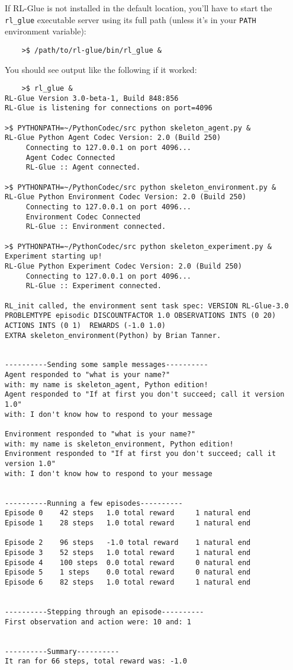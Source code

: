 \documentclass[11pt]{article}
\begin{document}
If RL-Glue is not installed in the default location, you'll have to start the \texttt{rl\_glue} executable server using its full path (unless it's in your \texttt{PATH} environment variable):
\begin{verbatim}
	>$ /path/to/rl-glue/bin/rl_glue &
\end{verbatim}

You should see output like the following if it worked:
\begin{verbatim}
	>$ rl_glue &
RL-Glue Version 3.0-beta-1, Build 848:856
RL-Glue is listening for connections on port=4096

>$ PYTHONPATH=~/PythonCodec/src python skeleton_agent.py &
RL-Glue Python Agent Codec Version: 2.0 (Build 250)
     Connecting to 127.0.0.1 on port 4096...
     Agent Codec Connected
     RL-Glue :: Agent connected.

>$ PYTHONPATH=~/PythonCodec/src python skeleton_environment.py &
RL-Glue Python Environment Codec Version: 2.0 (Build 250)
     Connecting to 127.0.0.1 on port 4096...
     Environment Codec Connected
     RL-Glue :: Environment connected.

>$ PYTHONPATH=~/PythonCodec/src python skeleton_experiment.py &
Experiment starting up!
RL-Glue Python Experiment Codec Version: 2.0 (Build 250)
     Connecting to 127.0.0.1 on port 4096...
     RL-Glue :: Experiment connected.

RL_init called, the environment sent task spec: VERSION RL-Glue-3.0 
PROBLEMTYPE episodic DISCOUNTFACTOR 1.0 OBSERVATIONS INTS (0 20) 
ACTIONS INTS (0 1)  REWARDS (-1.0 1.0)  
EXTRA skeleton_environment(Python) by Brian Tanner.


----------Sending some sample messages----------
Agent responded to "what is your name?" 
with: my name is skeleton_agent, Python edition!
Agent responded to "If at first you don't succeed; call it version 1.0" 
with: I don't know how to respond to your message

Environment responded to "what is your name?" 
with: my name is skeleton_environment, Python edition!
Environment responded to "If at first you don't succeed; call it version 1.0" 
with: I don't know how to respond to your message


----------Running a few episodes----------
Episode 0	 42 steps 	1.0 total reward	 1 natural end
Episode 1	 28 steps 	1.0 total reward	 1 natural end

Episode 2	 96 steps 	-1.0 total reward	 1 natural end
Episode 3	 52 steps 	1.0 total reward	 1 natural end
Episode 4	 100 steps 	0.0 total reward	 0 natural end
Episode 5	 1 steps 	0.0 total reward	 0 natural end
Episode 6	 82 steps 	1.0 total reward	 1 natural end


----------Stepping through an episode----------
First observation and action were: 10 and: 1


----------Summary----------
It ran for 66 steps, total reward was: -1.0
\end{verbatim}
\end{document}
